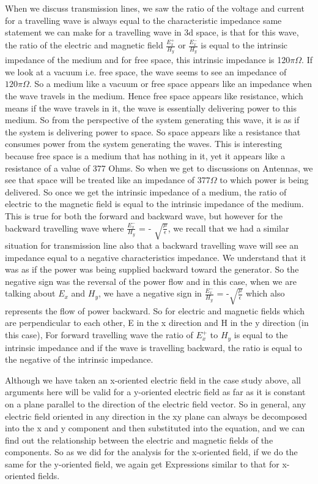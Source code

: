 When we discuss transmission lines, we saw the ratio of the voltage and current for a travelling wave is always equal to the characteristic impedance same statement we can make for a travelling wave in 3d space, is that for this wave, the ratio of the electric and magnetic field $\frac{E_x^{+}}{H_y}$ or $\frac{E_x^{-}}{H_y}$ is equal to the intrinsic impedance of the medium and for free space, this intrinsic impedance is 120$\pi\Omega$. If we look at a vacuum i.e. free space, the wave seems to see an impedance of $120\pi\Omega$. So a medium like a vacuum or free space appears like an impedance when the wave travels in the medium. Hence free space appears like resistance, which means if the wave travels in it, the wave is essentially delivering power to this medium. So from the perspective of the system generating this wave, it is as if the system is delivering power to space. So space appears like a resistance that consumes power from the system generating the waves. This is interesting because free space is a medium that has nothing in it, yet it appears like a resistance of a value of 377 Ohms. So when we get to discussions on Antennas, we see that space will be treated like an impedance of $377\Omega$ to which power is being delivered. So once we get the intrinsic impedance of a medium, the ratio of electric to the magnetic field is equal to the intrinsic impedance of the medium. This is true for both the forward and backward wave, but however for the backward travelling wave where $\frac{E_x^-}{H_y}$ = - $\sqrt{\frac{\mu}{\epsilon}}$, we recall that we had a similar situation for transmission line also that a backward travelling wave will see an impedance equal to a negative characteristics impedance. We understand that it was as if the power was being supplied backward toward the generator. So the negative sign was the reversal of the power flow and in this case, when we are talking about $E_x$ and $H_y$, we have a negative sign in $\frac{E_x^-}{H_y}$ = -$\sqrt{\frac{\mu}{\epsilon}}$ which also represents the flow of power backward. So for electric and magnetic fields which are perpendicular to each other, E in the x direction and H in the y direction (in this case), For forward travelling wave the ratio of $E_x^+$ to $H_y$ is equal to the intrinsic impedance and if the wave is travelling backward, the ratio is equal to the negative of the intrinsic impedance.

Although we have taken an x-oriented electric field in the case study above, all arguments here will be valid for a y-oriented electric field as far as it is constant on a plane parallel to the direction of the electric field vector. So in general, any electric field oriented in any direction in the xy plane can always be decomposed into the x and y component and then substituted into the equation, and we can find out the relationship between the electric and magnetic fields of the components. So as we did for the analysis for the x-oriented field, if we do the same for the y-oriented field, we again get Expressions similar to that for x-oriented fields.

